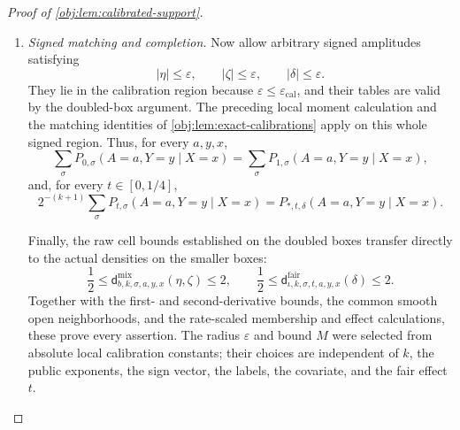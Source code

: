 \begin{proof}[Proof of \cref{obj:lem:calibrated-support}]
\begin{enumerate}
For the fair family,
\cref{obj:lem:exact-calibrations} gives
\[
E_{\mathbf s}\mathsf G\!\left(
 t,\mathfrak p(t,\delta,u)+\delta Z_u\right)
=\mathsf G\!\left(\mathsf T(t,\delta),
                       \mathfrak p(t,\delta,u)\right).
\]
The control-risk average is \(\mathfrak p(t,\delta,u)\), by
\(E_{\mathbf s}Z_u=0\). Since treatment is fair, the four averaged cells are therefore
\[
\begin{aligned}
E_{\mathbf s}\pi^{\mathrm{fair}}_{\mathrm r,\mathbf s,01}
&=\frac12\mathfrak p(t,\delta,u),&
E_{\mathbf s}\pi^{\mathrm{fair}}_{\mathrm r,\mathbf s,00}
&=\frac12\{1-\mathfrak p(t,\delta,u)\},\\
E_{\mathbf s}\pi^{\mathrm{fair}}_{\mathrm r,\mathbf s,11}
&=\frac12\mathsf G(\mathsf T(t,\delta),\mathfrak p(t,\delta,u)),&
E_{\mathbf s}\pi^{\mathrm{fair}}_{\mathrm r,\mathbf s,10}
&=\frac12\{1-\mathsf G(\mathsf T(t,\delta),\mathfrak p(t,\delta,u))\}.
\end{aligned}
\]
These are exactly the comparator cells. Counting sign extensions and using validity proves the required full uniform-average identity. The calibration identities invoked here apply also at \(t=0\), at zero amplitudes, and at \(u=0,1\).

\item \textit{Signed matching and completion.}
Now allow arbitrary signed amplitudes satisfying
\[
|\eta|\le\varepsilon,\qquad
|\zeta|\le\varepsilon,\qquad
|\delta|\le\varepsilon.
\]
They lie in the calibration region because
\(\varepsilon\le\varepsilon_{\mathrm{cal}}\), and their tables are valid by the doubled-box argument. The preceding local moment calculation and the matching identities of
\cref{obj:lem:exact-calibrations} apply on this whole signed region. Thus, for every \(a,y,x\),
\[
\sum_\sigma P_{0,\sigma}(A=a,Y=y\mid X=x)
=\sum_\sigma P_{1,\sigma}(A=a,Y=y\mid X=x),
\]
and, for every \(t\in[0,1/4]\),
\[
2^{-(k+1)}
\sum_\sigma P_{t,\sigma}(A=a,Y=y\mid X=x)
=P_{*,t,\delta}(A=a,Y=y\mid X=x).
\]

Finally, the raw cell bounds established on the doubled boxes transfer directly to the actual densities on the smaller boxes:
\[
\frac12\le
\mathsf d^{\mathrm{mix}}_{b,k,\sigma,a,y,x}(\eta,\zeta)
\le2,
\qquad
\frac12\le
\mathsf d^{\mathrm{fair}}_{\iota,k,\sigma,t,a,y,x}(\delta)
\le2.
\]
Together with the first- and second-derivative bounds, the common smooth open neighborhoods, and the rate-scaled membership and effect calculations, these prove every assertion. The radius \(\varepsilon\) and bound \(M\) were selected from absolute local calibration constants; their choices are independent of \(k\), the public exponents, the sign vector, the labels, the covariate, and the fair effect \(t\).
\end{enumerate}
\end{proof}
